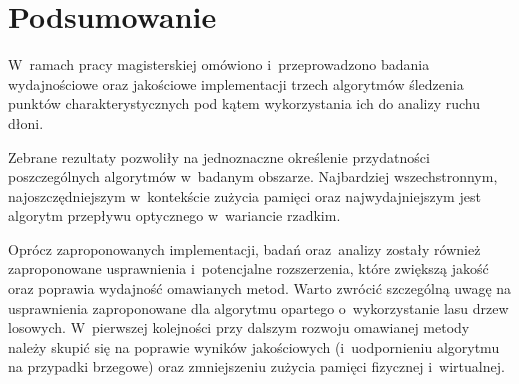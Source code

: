   \section{Podsumowanie}

    W~ramach pracy magisterskiej omówiono i~przeprowadzono badania wydajnościowe oraz jakościowe implementacji trzech algorytmów śledzenia punktów charakterystycznych pod kątem wykorzystania ich do analizy ruchu dłoni.

    Zebrane rezultaty pozwoliły na jednoznaczne określenie przydatności poszczególnych algorytmów w~badanym obszarze. Najbardziej wszechstronnym, najoszczędniejszym w~kontekście zużycia pamięci oraz najwydajniejszym jest algorytm przepływu optycznego w~wariancie rzadkim.

    Oprócz zaproponowanych implementacji, badań oraz~analizy zostały również zaproponowane usprawnienia i~potencjalne rozszerzenia, które zwiększą jakość oraz poprawia wydajność omawianych metod. Warto zwrócić szczególną uwagę na usprawnienia zaproponowane dla algorytmu opartego o~wykorzystanie lasu drzew losowych. W~pierwszej kolejności przy dalszym rozwoju omawianej metody należy skupić się na poprawie wyników jakościowych (i~uodpornieniu algorytmu na przypadki brzegowe) oraz zmniejszeniu zużycia pamięci fizycznej i~wirtualnej.